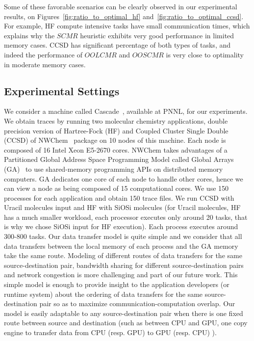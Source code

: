 \documentclass[sigconf]{acmart}
\begin{document}
{		Some of these favorable scenarios can be clearly observed in our experimental results, on Figures~\ref{fig:ratio_to_optimal_hf} and~\ref{fig:ratio_to_optimal_ccsd}. For example, HF compute intensive tasks have small communication times, which explains why the $SCMR$ heuristic exhibits very good performance in limited memory cases. CCSD has significant percentage of both types of tasks, and indeed the performance of $OOLCMR$ and $OOSCMR$ is very close to optimality in moderate memory cases. 
		
		\subsection{Experimental Settings}
		\label{sec:expSetting}
		
		We consider a machine called Cascade~\cite{Cascade}, available at PNNL, for our experiments. We obtain traces by running two molecular chemistry applications, double precision version of Hartree-Fock (HF) and Coupled Cluster Single Double (CCSD) of NWChem~\cite{NWChem} package on 10 nodes of this machine. Each node is composed of 16 Intel Xeon E5-2670 cores. NWChem takes advantages of a Partitioned Global Address Space Programming Model called Global Arrays (GA)~\cite{GlobalArray} to use shared-memory programming APIs on distributed memory computers. GA dedicates one core of each node to handle other cores, hence we can view a node as being composed of 15 computational cores. We use 150 processes for each application and obtain 150 trace files. We run CCSD with Uracil molecules input and HF with SiOSi molecules (for Uracil molecules, HF has a much smaller workload, each processor executes only around 20 tasks, that is why we chose SiOSi input for HF execution). Each process executes around 300-800 tasks. Our data transfer model is quite simple and we consider that all data transfers between the local memory of each process and the GA memory take the same route. Modeling of different routes of data transfers for the same source-destination pair, bandwidth sharing for different source-destination pairs and network congestion is more challenging and part of our future work. This simple model is enough to provide insight to the application developers (or runtime system) about the ordering of data transfers for the same source-destination pair so as to maximize communication-computation overlap. Our model is easily adaptable to any source-destination pair when there is one fixed route between source and destination (such as between CPU and GPU, one copy engine to transfer data from CPU (resp. GPU) to GPU (resp. CPU) ).
		
}
\end{document}

